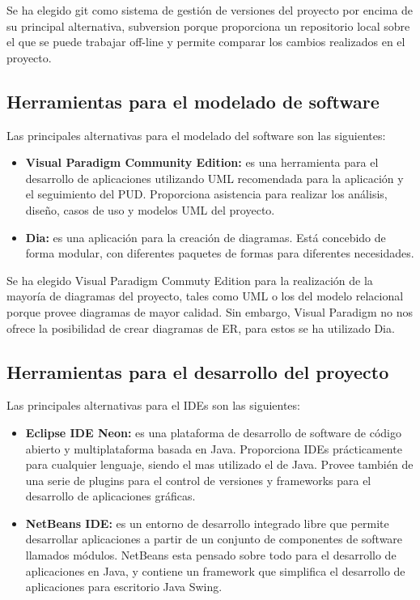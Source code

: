 \documentclass[12pt, a4paper]{book}
\begin{document}
Se ha elegido git como sistema de gestión de versiones del proyecto por encima de su principal alternativa, subversion porque proporciona un repositorio local sobre el que se puede trabajar off-line y permite comparar los cambios realizados en el proyecto.



\subsection{Herramientas para el modelado de software}

Las principales alternativas para el modelado del software son las siguientes:

\begin{itemize}
	\item \textbf{Visual Paradigm Community Edition:} es una herramienta para el desarrollo de aplicaciones utilizando \gls{UML} recomendada para la aplicación y el seguimiento del \gls{PUD}. Proporciona asistencia para realizar los análisis, diseño, casos de uso y modelos \gls{UML} del proyecto.
	
	\item \textbf{Dia:} es una aplicación para la creación de diagramas. Está concebido de forma modular, con diferentes paquetes de formas para diferentes necesidades.
	
	
\end{itemize}

Se ha elegido Visual Paradigm Commuty Edition para la realización de la mayoría de diagramas del proyecto, tales como \gls{UML} o los del modelo relacional porque provee diagramas de mayor calidad. Sin embargo, Visual Paradigm no nos ofrece la posibilidad de crear diagramas de \gls{ER}, para estos se ha utilizado Dia.

\newpage

\subsection{Herramientas para el desarrollo del proyecto}

Las principales alternativas para el \glspl{IDE} son las siguientes:

\begin{itemize}
	\item \textbf{Eclipse IDE Neon:} es una plataforma de desarrollo de software de código abierto y multiplataforma basada en Java. Proporciona \glspl{IDE} prácticamente para cualquier lenguaje, siendo el mas utilizado el de Java. Provee también de una serie de plugins para el control de versiones y frameworks para el desarrollo de aplicaciones gráficas.
	
	
	\item \textbf{NetBeans IDE:} es un entorno de desarrollo integrado libre que permite desarrollar aplicaciones a partir de un conjunto de componentes de software llamados módulos. NetBeans esta pensado sobre todo para el desarrollo de aplicaciones en Java, y contiene un framework que simplifica el desarrollo de aplicaciones para escritorio Java Swing.
	
	
\end{itemize}
\end{document}
